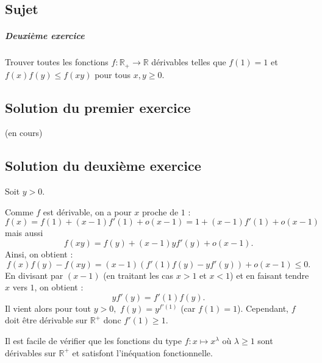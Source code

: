 \chapter{}

\section{Sujet}

\paragraph{Deuxième exercice}

Trouver toutes les fonctions $f : \mathbb R_+ \to \mathbb R$ dérivables telles que $f(1)=1$ et $f(x)f(y) \leq f(xy)$ pour tous $x,y \geqslant 0$.

\section{Solution du premier exercice} %

(en cours)

\section{Solution du deuxième exercice} %

Soit $y>0.$

Comme $f$ est dérivable, on a pour $x$ proche de $1$ : 
$$f(x)=f(1)+(x-1)f'(1)+o(x-1)=1+(x-1)f'(1)+o(x-1)$$ mais aussi $$ f(xy)=f(y)+(x-1)yf'(y)+o(x-1).$$
Ainsi, on obtient : $$f(x)f(y)-f(xy)=(x-1)\left( f'(1)f(y)-yf'(y) \right)+o(x-1)\leq 0.$$
En divisant par $(x-1)$ (en traitant les cas $x>1$ et $x<1$) et en faisant tendre $x$ vers $1$, on obtient : $$yf'(y)=f'(1)f(y).$$
Il vient alors pour tout $y>0,$ $\displaystyle f(y)=y^{f'(1)}$ (car $f(1)=1$).
Cependant, $f$ doit être dérivable sur $\mathbb{R}^{+}$ donc $f'(1)\geq 1.$

Il est facile de vérifier que les fonctions du type $ f: x\mapsto x^{\lambda}$ où $\lambda\geq 1$ sont dérivables sur $\mathbb{R}^{+}$ et satisfont l'inéquation fonctionnelle.